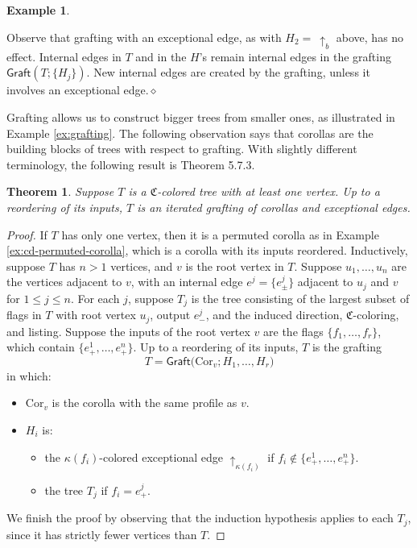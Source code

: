 \documentclass{amsbook}
\numberwithin{section}{chapter}
\numberwithin{subsection}{section}
\numberwithin{equation}{section}
\theoremstyle{plain}
\newtheorem{theorem}[equation]{Theorem}
\theoremstyle{definition}
\newtheorem{example}[equation]{Example}
\newcommand{\colorc}{\mathfrak{C}}
\newcommand{\Cor}{\mathrm{Cor}}
\newcommand{\graft}{\mathsf{Graft}}
\newcommand{\dqed}{\hfill$\diamond$}
\begin{document}
\begin{example}
\begin{center}
\end{center}
Observe that grafting with an exceptional edge, as with $H_2 =~ \uparrow_b$ above, has no effect.  Internal edges in $T$ and in the $H$'s remain internal edges in the grafting $\graft(T;\{H_j\})$.  New internal edges are created by the grafting, unless it involves an exceptional edge.\dqed
\end{example}

Grafting allows us to construct bigger trees from smaller ones, as illustrated in Example \ref{ex:grafting}.  The following observation says that corollas are the building blocks of trees with respect to grafting.  With slightly different terminology, the following result is \cite{yau-operad} Theorem 5.7.3.

\begin{theorem}\label{thm:grafting-generate}
Suppose $T$ is a $\colorc$-colored tree with at least one vertex.  Up to a reordering of its inputs, $T$ is an iterated grafting of corollas and exceptional edges.
\end{theorem}

\begin{proof}
If $T$ has only one vertex, then it is a permuted corolla as in Example \ref{ex:cd-permuted-corolla}, which is a corolla with its inputs reordered.  Inductively,  suppose $T$ has $n>1$ vertices, and $v$ is the root vertex in $T$.  Suppose $u_1,\ldots,u_n$ are the vertices adjacent to $v$, with an internal edge $e^j=\{e^j_{\pm}\}$ adjacent to $u_j$ and $v$ for $1 \leq j \leq n$.  For each $j$, suppose $T_j$ is the tree consisting of the largest subset of flags in $T$ with root vertex $u_j$, output $e^j_-$, and the induced direction, $\colorc$-coloring, and listing.  Suppose the inputs of the root vertex $v$ are the flags $\{f_1,\ldots,f_r\}$, which contain $\{e^1_+,\ldots,e^n_+\}$.   Up to a reordering of its inputs, $T$ is the grafting
\[T = \graft\bigl(\Cor_v;H_1,\ldots,H_r\bigr)\] in which:
\begin{itemize}
\item $\Cor_v$ is the corolla with the same profile as $v$.
\item $H_i$ is:
\begin{itemize}\item the $\kappa(f_i)$-colored exceptional edge $\uparrow_{\kappa(f_i)}$ if $f_i \not\in\{e^1_+,\ldots,e^n_+\}$.
\item the tree $T_j$ if $f_i=e^j_+$.
\end{itemize}\end{itemize} 
We finish the proof by observing that the induction hypothesis applies to each $T_j$, since it has strictly fewer vertices than $T$.
\end{proof}
\end{document}
